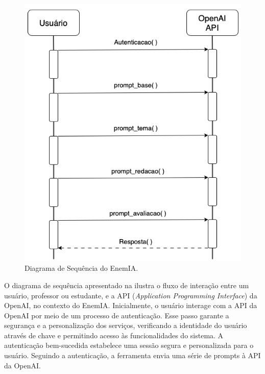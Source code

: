 \documentclass[portuguese]{textolivre}
\begin{document}
\begin{figure}[htbp]
\centering
\begin{minipage}{.55\textwidth}
\includegraphics[width=\textwidth]{fig01}
 \caption{Diagrama de Sequência do EnemIA.}
 \label{fig01}
\end{minipage}
\end{figure}

O diagrama de sequência \cite{uml} apresentado na  ilustra o fluxo de interação entre um usuário, professor ou estudante, e a API (\emph{Application Programming Interface}) da OpenAI, no contexto do EnemIA. Inicialmente, o usuário interage com a API da OpenAI por meio de um processo de autenticação. Esse passo garante a segurança e a personalização dos serviços, verificando a identidade do usuário através de chave e permitindo acesso às funcionalidades do sistema. A autenticação bem-sucedida estabelece uma sessão segura e personalizada para o usuário.
Seguindo a autenticação, a ferramenta envia uma série de prompts à API da OpenAI. 
\end{document}
